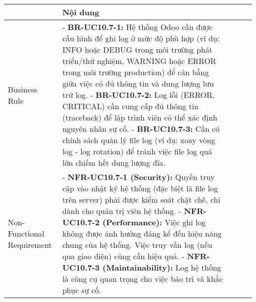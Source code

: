 \begin{longtable}{|m{2cm}|m{2.5cm}|m{2cm}|m{4.5cm}|m{4cm}|}
\begin{longtable}{|m{4cm}|p{11cm}|}
\hline
\textbf{Mục} & \textbf{Nội dung} \\
\hline
Business Rule & - \textbf{BR-UC10.7-1:} Hệ thống Odoo cần được cấu hình để ghi log ở mức độ phù hợp (ví dụ: INFO hoặc DEBUG trong môi trường phát triển/thử nghiệm, WARNING hoặc ERROR trong môi trường production) để cân bằng giữa việc có đủ thông tin và dung lượng lưu trữ log. \newline - \textbf{BR-UC10.7-2:} Log lỗi (ERROR, CRITICAL) cần cung cấp đủ thông tin (traceback) để lập trình viên có thể xác định nguyên nhân sự cố. \newline - \textbf{BR-UC10.7-3:} Cần có chính sách quản lý file log (ví dụ: xoay vòng log - log rotation) để tránh việc file log quá lớn chiếm hết dung lượng đĩa. \\
\hline
Non-Functional Requirement & - \textbf{NFR-UC10.7-1 (Security):} Quyền truy cập vào nhật ký hệ thống (đặc biệt là file log trên server) phải được kiểm soát chặt chẽ, chỉ dành cho quản trị viên hệ thống. \newline - \textbf{NFR-UC10.7-2 (Performance):} Việc ghi log không được ảnh hưởng đáng kể đến hiệu năng chung của hệ thống. Việc truy vấn log (nếu qua giao diện) cũng cần hiệu quả. \newline - \textbf{NFR-UC10.7-3 (Maintainability):} Log hệ thống là công cụ quan trọng cho việc bảo trì và khắc phục sự cố. \\
\hline
\end{longtable}

